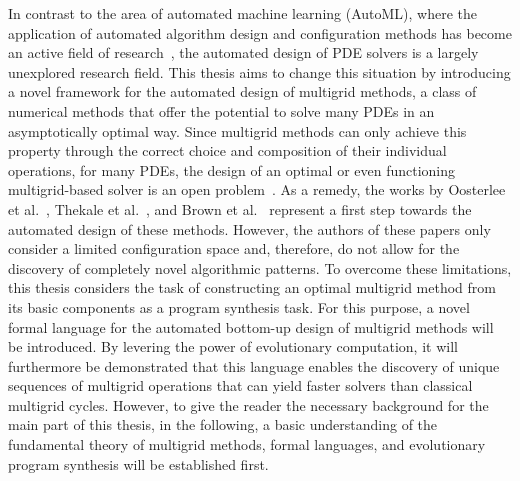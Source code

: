 In contrast to the area of automated machine learning (AutoML), where the application of automated algorithm design and configuration methods has become an active field of research~\cite{ren2021comprehensive,hutter2019automated,elsken2019neural,he2021automl,schrodi2022towards}, the automated design of PDE solvers is a largely unexplored research field.
This thesis aims to change this situation by introducing a novel framework for the automated design of multigrid methods, a class of numerical methods that offer the potential to solve many PDEs in an asymptotically optimal way.
Since multigrid methods can only achieve this property through the correct choice and composition of their individual operations, for many PDEs, the design of an optimal or even functioning multigrid-based solver is an open problem~\cite{trottenberg2000multigrid,ernst2012difficult}.
As a remedy, the works by Oosterlee et al.~\cite{oosterlee2003genetic}, Thekale et al.~\cite{thekale2010optimizing}, and Brown et al.~\cite{brown2021tuning} represent a first step towards the automated design of these methods.
However, the authors of these papers only consider a limited configuration space and, therefore, do not allow for the discovery of completely novel algorithmic patterns.
To overcome these limitations, this thesis considers the task of constructing an optimal multigrid method from its basic components as a program synthesis task.
For this purpose, a novel formal language for the automated bottom-up design of multigrid methods will be introduced.
By levering the power of evolutionary computation, it will furthermore be demonstrated that this language enables the discovery of unique sequences of multigrid operations that can yield faster solvers than classical multigrid cycles.
However, to give the reader the necessary background for the main part of this thesis, in the following, a basic understanding of the fundamental theory of multigrid methods, formal languages, and evolutionary program synthesis will be established first.

